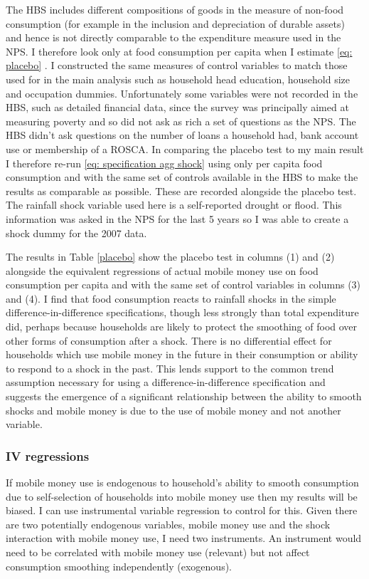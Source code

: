 The HBS includes different compositions of goods in the measure of non-food consumption (for example in the inclusion and depreciation of durable assets) and hence is not directly comparable to the expenditure measure used in the NPS. I therefore look only at food consumption per capita when I estimate \eqref{eq: placebo} . I constructed the same measures of control variables to match those used for in the main analysis such as household head education, household size and occupation dummies. Unfortunately some variables were not recorded in the HBS, such as detailed financial data, since the survey was principally aimed at measuring poverty and so did not ask as rich a set of questions as the NPS. The HBS didn't ask questions on the number of loans a household had, bank account use or membership of a ROSCA. In comparing the placebo test to my main result I therefore re-run \eqref{eq: specification agg shock} using only per capita food consumption and with the same set of controls available in the HBS to make the results as comparable as possible. These are recorded alongside the placebo test. The rainfall shock variable used here is a self-reported drought or flood. This information was asked in the NPS for the last 5 years so I was able to create a shock dummy for the 2007 data. 

The results in Table \ref{placebo} show the placebo test in columns (1) and (2) alongside the equivalent regressions of actual mobile money use on food consumption per capita and with the same set of control variables in columns (3) and (4). I find that food consumption reacts to rainfall shocks in the simple difference-in-difference specifications, though less strongly than total expenditure did, perhaps because households are likely to protect the smoothing of food over other forms of consumption after a shock. There is no differential effect for households which use mobile money in the future in their consumption or ability to respond to a shock in the past. This lends support to the common trend assumption necessary for using a difference-in-difference specification and suggests the emergence of a significant relationship between the ability to smooth shocks and mobile money is due to the use of mobile money and not another variable.   

\subsubsection{IV regressions}
If mobile money use is endogenous to household's ability to smooth consumption due to self-selection of households into mobile money use then my results will be biased. I can use instrumental variable regression to control for this. Given there are two potentially endogenous variables, mobile money use and the shock interaction with mobile money use, I need two instruments. An instrument would need to be correlated with mobile money use (relevant) but not affect consumption smoothing independently (exogenous). 

